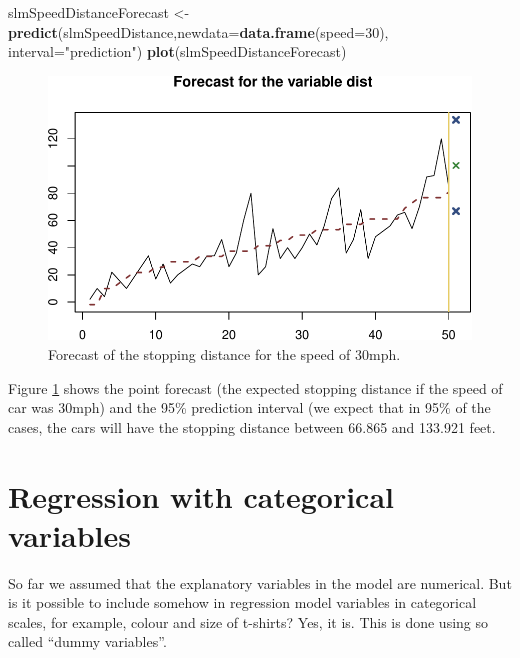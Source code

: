 \documentclass[
]{book}
\newenvironment{Shaded}{\begin{snugshade}}{\end{snugshade}}
\newcommand{\AttributeTok}[1]{\textcolor[rgb]{0.13,0.29,0.53}{#1}}
\newcommand{\DecValTok}[1]{\textcolor[rgb]{0.00,0.00,0.81}{#1}}
\newcommand{\FunctionTok}[1]{\textcolor[rgb]{0.13,0.29,0.53}{\textbf{#1}}}
\newcommand{\NormalTok}[1]{#1}
\newcommand{\OtherTok}[1]{\textcolor[rgb]{0.56,0.35,0.01}{#1}}
\newcommand{\StringTok}[1]{\textcolor[rgb]{0.31,0.60,0.02}{#1}}
\theoremstyle{definition}
\theoremstyle{definition}
\theoremstyle{definition}
\theoremstyle{definition}
\theoremstyle{remark}
\begin{document}
\begin{Shaded}
\begin{Highlighting}[]
\NormalTok{slmSpeedDistanceForecast }\OtherTok{\textless{}{-}} \FunctionTok{predict}\NormalTok{(slmSpeedDistance,}\AttributeTok{newdata=}\FunctionTok{data.frame}\NormalTok{(}\AttributeTok{speed=}\DecValTok{30}\NormalTok{),}
                                    \AttributeTok{interval=}\StringTok{"prediction"}\NormalTok{)}
\FunctionTok{plot}\NormalTok{(slmSpeedDistanceForecast)}
\end{Highlighting}
\end{Shaded}

\begin{figure}
\centering
\includegraphics{Svetunkov---Statistics-for-Business-Analytics_files/figure-latex/speedDistanceForecast-1.pdf}
\caption{\label{fig:speedDistanceForecast}Forecast of the stopping distance for the speed of 30mph.}
\end{figure}

Figure \ref{fig:speedDistanceForecast} shows the point forecast (the expected stopping distance if the speed of car was 30mph) and the 95\% prediction interval (we expect that in 95\% of the cases, the cars will have the stopping distance between 66.865 and 133.921 feet.

\chapter{Regression with categorical variables}\label{dummyVariables}

So far we assumed that the explanatory variables in the model are numerical. But is it possible to include somehow in regression model variables in categorical scales, for example, colour and size of t-shirts? Yes, it is. This is done using so called ``dummy variables''.
\end{document}
